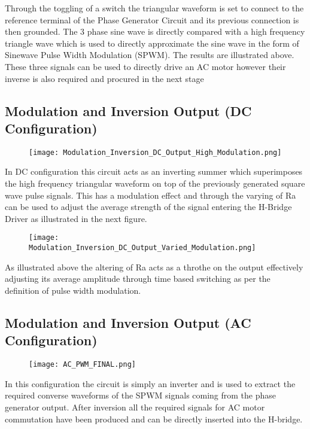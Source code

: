 \documentclass[12pt]{article}
\begin{document}
\begin{appendices}
Through the toggling of a switch the triangular waveform is set to connect to the reference terminal of the Phase Generator Circuit and its previous connection is then grounded. The 3 phase sine wave is directly compared with a high frequency triangle wave which is used to directly approximate the sine wave in the form of Sinewave Pulse Width Modulation (SPWM). The results are illustrated above.  These three signals can be used to directly drive an AC motor however their inverse is also required and procured in the next stage

\subsection{Modulation and Inversion Output (DC Configuration)}
\begin{figure}[H]
\centering
\texttt{[image: Modulation\_Inversion\_DC\_Output\_High\_Modulation.png]}
\label{Triangle_Gen_Output}
\end{figure}

In DC configuration this circuit acts as an inverting summer which superimposes the high frequency triangular waveform on top of the previously generated square wave pulse signals. This has a modulation effect and through the varying of Ra can be used to adjust the average strength of the signal entering the H-Bridge Driver as illustrated in the next figure.

\begin{figure}[H]
\centering
\texttt{[image: Modulation\_Inversion\_DC\_Output\_Varied\_Modulation.png]}
\label{Triangle_Gen_Output}
\end{figure}

As illustrated above the altering of Ra acts as a throthe on the output effectively adjusting its average amplitude through time based switching as per the definition of pulse width modulation.

\subsection{Modulation and Inversion Output (AC Configuration)}

\begin{figure}[H]
\centering
\texttt{[image: AC\_PWM\_FINAL.png]}
\label{Triangle_Gen_Output}
\end{figure}


In this configuration the circuit is simply an inverter and is used to extract the required converse waveforms of the SPWM signals coming from the phase generator output. After inversion all the required signals for AC motor commutation have been produced and can be directly inserted into the H-bridge.


\end{appendices}
\end{document}
